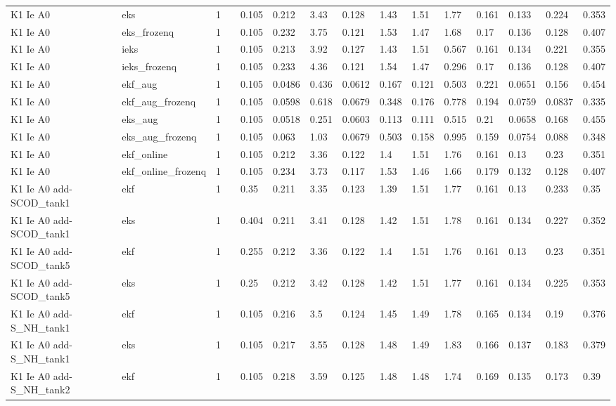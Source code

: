 \begin{table}[t]
\begin{tabular}{lllllllllllllll}
K1 Ie A0 & eks & 1 &  & 0.105 & 0.212 & 3.43 & 0.128 & 1.43 & 1.51 & 1.77 & 0.161 & 0.133 & 0.224 & 0.353 \\
K1 Ie A0 & eks\_frozenq & 1 &  & 0.105 & 0.232 & 3.75 & 0.121 & 1.53 & 1.47 & 1.68 & 0.17 & 0.136 & 0.128 & 0.407 \\
K1 Ie A0 & ieks & 1 &  & 0.105 & 0.213 & 3.92 & 0.127 & 1.43 & 1.51 & 0.567 & 0.161 & 0.134 & 0.221 & 0.355 \\
K1 Ie A0 & ieks\_frozenq & 1 &  & 0.105 & 0.233 & 4.36 & 0.121 & 1.54 & 1.47 & 0.296 & 0.17 & 0.136 & 0.128 & 0.407 \\
K1 Ie A0 & ekf\_aug & 1 &  & 0.105 & 0.0486 & 0.436 & 0.0612 & 0.167 & 0.121 & 0.503 & 0.221 & 0.0651 & 0.156 & 0.454 \\
K1 Ie A0 & ekf\_aug\_frozenq & 1 &  & 0.105 & 0.0598 & 0.618 & 0.0679 & 0.348 & 0.176 & 0.778 & 0.194 & 0.0759 & 0.0837 & 0.335 \\
K1 Ie A0 & eks\_aug & 1 &  & 0.105 & 0.0518 & 0.251 & 0.0603 & 0.113 & 0.111 & 0.515 & 0.21 & 0.0658 & 0.168 & 0.455 \\
K1 Ie A0 & eks\_aug\_frozenq & 1 &  & 0.105 & 0.063 & 1.03 & 0.0679 & 0.503 & 0.158 & 0.995 & 0.159 & 0.0754 & 0.088 & 0.348 \\
K1 Ie A0 & ekf\_online & 1 &  & 0.105 & 0.212 & 3.36 & 0.122 & 1.4 & 1.51 & 1.76 & 0.161 & 0.13 & 0.23 & 0.351 \\
K1 Ie A0 & ekf\_online\_frozenq & 1 &  & 0.105 & 0.234 & 3.73 & 0.117 & 1.53 & 1.46 & 1.66 & 0.179 & 0.132 & 0.128 & 0.407 \\
K1 Ie A0 add-SCOD\_tank1 & ekf & 1 &  & 0.35 & 0.211 & 3.35 & 0.123 & 1.39 & 1.51 & 1.77 & 0.161 & 0.13 & 0.233 & 0.35 \\
K1 Ie A0 add-SCOD\_tank1 & eks & 1 &  & 0.404 & 0.211 & 3.41 & 0.128 & 1.42 & 1.51 & 1.78 & 0.161 & 0.134 & 0.227 & 0.352 \\
K1 Ie A0 add-SCOD\_tank5 & ekf & 1 &  & 0.255 & 0.212 & 3.36 & 0.122 & 1.4 & 1.51 & 1.76 & 0.161 & 0.13 & 0.23 & 0.351 \\
K1 Ie A0 add-SCOD\_tank5 & eks & 1 &  & 0.25 & 0.212 & 3.42 & 0.128 & 1.42 & 1.51 & 1.77 & 0.161 & 0.134 & 0.225 & 0.353 \\
K1 Ie A0 add-S\_NH\_tank1 & ekf & 1 &  & 0.105 & 0.216 & 3.5 & 0.124 & 1.45 & 1.49 & 1.78 & 0.165 & 0.134 & 0.19 & 0.376 \\
K1 Ie A0 add-S\_NH\_tank1 & eks & 1 &  & 0.105 & 0.217 & 3.55 & 0.128 & 1.48 & 1.49 & 1.83 & 0.166 & 0.137 & 0.183 & 0.379 \\
K1 Ie A0 add-S\_NH\_tank2 & ekf & 1 &  & 0.105 & 0.218 & 3.59 & 0.125 & 1.48 & 1.48 & 1.74 & 0.169 & 0.135 & 0.173 & 0.39 \\

\end{tabular}
\end{table}
